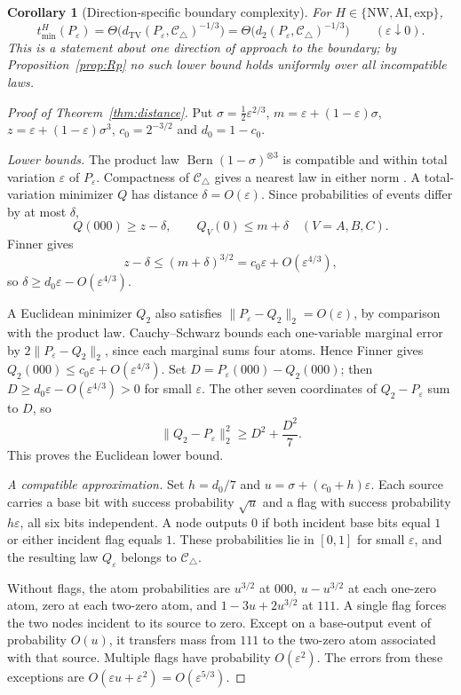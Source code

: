 \documentclass[11pt]{article}
\theoremstyle{plain}
\newtheorem{corollary}[theorem]{Corollary}
\theoremstyle{definition}
\DeclareMathOperator{\Bern}{Bern}
\DeclareMathOperator{\TV}{TV}
\newcommand{\Ctri}{\mathcal C_{\triangle}}
\newcommand{\eps}{\varepsilon}
\newcommand{\tmin}{t_{\min}}
\begin{document}
\begin{corollary}[Direction-specific boundary complexity]\label{cor:geometry}
For $H\in\{\mathrm{NW},\mathrm{AI},\mathrm{exp}\}$,
\[
\tmin^H(P_\eps)=\Theta\bigl(d_{\TV}(P_\eps,\Ctri)^{-1/3}\bigr)=\Theta\bigl(d_2(P_\eps,\Ctri)^{-1/3}\bigr)\qquad(\eps\downarrow0).
\]
This is a statement about one direction of approach to the boundary; by Proposition~\ref{prop:Rp} no such lower bound holds uniformly over all incompatible laws.
\end{corollary}

\begin{proof}[Proof of Theorem~\ref{thm:distance}]
Put $\sigma=\tfrac12\eps^{2/3}$, $m=\eps+(1-\eps)\sigma$, $z=\eps+(1-\eps)\sigma^3$, $c_0=2^{-3/2}$ and $d_0=1-c_0$.

\emph{Lower bounds.} The product law $\Bern(1-\sigma)^{\otimes3}$ is compatible and within total variation $\eps$ of $P_\eps$. Compactness of $\Ctri$ gives a nearest law in either norm \cite{RGW2018}. A total-variation minimizer $Q$ has distance $\delta=O(\eps)$. Since probabilities of events differ by at most $\delta$,
\[
Q(000)\ge z-\delta,\qquad Q_V(0)\le m+\delta\quad(V=A,B,C).
\]
Finner gives
\[
z-\delta\le(m+\delta)^{3/2}
 =c_0\eps+O(\eps^{4/3}),
\]
so $\delta\ge d_0\eps-O(\eps^{4/3})$.

A Euclidean minimizer $Q_2$ also satisfies $\|P_\eps-Q_2\|_2=O(\eps)$, by comparison with the product law. Cauchy--Schwarz bounds each one-variable marginal error by $2\|P_\eps-Q_2\|_2$, since each marginal sums four atoms. Hence Finner gives $Q_2(000)\le c_0\eps+O(\eps^{4/3})$. Set $D=P_\eps(000)-Q_2(000)$; then $D\ge d_0\eps-O(\eps^{4/3})>0$ for small $\eps$. The other seven coordinates of $Q_2-P_\eps$ sum to $D$, so
\[
\|Q_2-P_\eps\|_2^2\ge D^2+\frac{D^2}{7}.
\]
This proves the Euclidean lower bound.

\emph{A compatible approximation.} Set $h=d_0/7$ and $u=\sigma+(c_0+h)\eps$. Each source carries a base bit with success probability $\sqrt u$ and a flag with success probability $h\eps$, all six bits independent. A node outputs $0$ if both incident base bits equal $1$ or either incident flag equals $1$. These probabilities lie in $[0,1]$ for small $\eps$, and the resulting law $Q_\eps$ belongs to $\Ctri$.

Without flags, the atom probabilities are $u^{3/2}$ at $000$, $u-u^{3/2}$ at each one-zero atom, zero at each two-zero atom, and $1-3u+2u^{3/2}$ at $111$. A single flag forces the two nodes incident to its source to zero. Except on a base-output event of probability $O(u)$, it transfers mass from $111$ to the two-zero atom associated with that source. Multiple flags have probability $O(\eps^2)$. The errors from these exceptions are $O(\eps u+\eps^2)=O(\eps^{5/3})$.


\end{proof}
\end{document}
